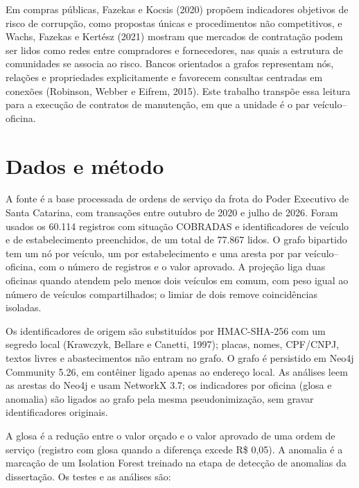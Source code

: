 \documentclass[12pt,a4paper]{article}
\begin{document}
Em compras públicas, Fazekas e Kocsis (2020) propõem indicadores objetivos de risco de corrupção, como propostas únicas e procedimentos não competitivos, e Wachs, Fazekas e Kertész (2021) mostram que mercados de contratação podem ser lidos como redes entre compradores e fornecedores, nas quais a estrutura de comunidades se associa ao risco. Bancos orientados a grafos representam nós, relações e propriedades explicitamente e favorecem consultas centradas em conexões (Robinson, Webber e Eifrem, 2015). Este trabalho transpõe essa leitura para a execução de contratos de manutenção, em que a unidade é o par veículo–oficina.

\section{Dados e método}
A fonte é a base processada de ordens de serviço da frota do Poder Executivo de Santa Catarina, com transações entre outubro de 2020 e julho de 2026. Foram usados os 60.114 registros com situação COBRADAS e identificadores de veículo e de estabelecimento preenchidos, de um total de 77.867 lidos. O grafo bipartido tem um nó por veículo, um por estabelecimento e uma aresta por par veículo–oficina, com o número de registros e o valor aprovado. A projeção liga duas oficinas quando atendem pelo menos dois veículos em comum, com peso igual ao número de veículos compartilhados; o limiar de dois remove coincidências isoladas.

Os identificadores de origem são substituídos por HMAC-SHA-256 com um segredo local (Krawczyk, Bellare e Canetti, 1997); placas, nomes, CPF/CNPJ, textos livres e abastecimentos não entram no grafo. O grafo é persistido em Neo4j Community 5.26, em contêiner ligado apenas ao endereço local. As análises leem as arestas do Neo4j e usam NetworkX 3.7; os indicadores por oficina (glosa e anomalia) são ligados ao grafo pela mesma pseudonimização, sem gravar identificadores originais.

A glosa é a redução entre o valor orçado e o valor aprovado de uma ordem de serviço (registro com glosa quando a diferença excede R\$ 0,05). A anomalia é a marcação de um Isolation Forest treinado na etapa de detecção de anomalias da dissertação. Os testes e as análises são:
\end{document}
